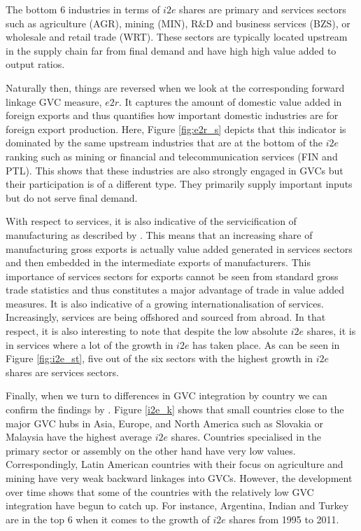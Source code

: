 \documentclass[11pt,a4paper]{article}
\begin{document}
The bottom 6 industries in terms of $i2e$ shares are primary and services sectors such as agriculture (AGR), mining (MIN), R\&D and business services (BZS), or wholesale and retail trade (WRT). These sectors are typically located upstream in the supply chain far from final demand and have high high value added to output ratios.


Naturally then, things are reversed when we look at the corresponding forward linkage GVC measure, $e2r$. It captures the amount of domestic value added in foreign exports and thus quantifies how important domestic industries are for foreign export production. Here, Figure \ref{fig:e2r_s} depicts that this indicator is dominated by the same upstream industries that are at the bottom of the $i2e$ ranking such as mining or financial and telecommunication services (FIN and PTL). This shows that these industries are also strongly engaged in GVCs but their participation is of a different type. They primarily supply important inputs but do not serve final demand. 

With respect to services, it is also indicative of the servicification of manufacturing as described by \citet{ribaetal15}. This means that an increasing share of manufacturing gross exports is actually value added generated in services sectors and then embedded in the intermediate exports of manufacturers. This importance of services sectors for exports cannot be seen from standard gross trade statistics and thus constitutes a major advantage of trade in value added measures. It is also indicative of a growing internationalisation of services. Increasingly, services are being offshored and sourced from abroad. In that respect, it is also interesting to note that despite the low absolute $i2e$ shares, it is in services where a lot of the growth in $i2e$ has taken place. As can be seen in Figure \ref{fig:i2e_st}, five out of the six sectors with the highest growth in $i2e$ shares are services sectors.


Finally, when we turn to differences in GVC integration by country we can confirm the findings by \citet{ribajalo13}. Figure \ref{i2e_k} shows that small countries close to the major GVC hubs in Asia, Europe, and North America such as Slovakia or Malaysia have the highest average $i2e$ shares. Countries specialised in the primary sector or assembly on the other hand have very low values. Correspondingly, Latin American countries with their focus on agriculture and mining have very weak backward linkages into GVCs. However, the development over time shows that some of the countries with the relatively low GVC integration have begun to catch up. For instance, Argentina, Indian and Turkey are in the top 6 when it comes to the growth of $i2e$ shares from 1995 to 2011.
\end{document}
